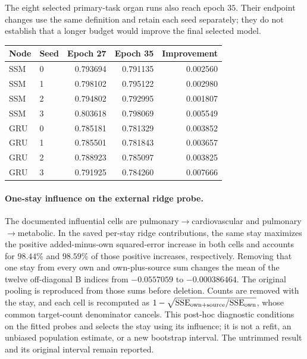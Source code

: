 The eight selected primary-task organ runs also reach epoch $35$. Their endpoint changes use the same definition and retain each seed separately; they do not establish that a longer budget would improve the final selected model.

\begin{center}\small
\begin{tabular}{llrrr}
\toprule
Node & Seed & Epoch 27 & Epoch 35 & Improvement\\
\midrule
SSM & 0 & 0.793694 & 0.791135 & 0.002560 \\
SSM & 1 & 0.798102 & 0.795122 & 0.002980 \\
SSM & 2 & 0.794802 & 0.792995 & 0.001807 \\
SSM & 3 & 0.803618 & 0.798069 & 0.005549 \\
GRU & 0 & 0.785181 & 0.781329 & 0.003852 \\
GRU & 1 & 0.785501 & 0.781843 & 0.003657 \\
GRU & 2 & 0.788923 & 0.785097 & 0.003825 \\
GRU & 3 & 0.791925 & 0.784260 & 0.007666 \\
\bottomrule
\end{tabular}
\end{center}

\paragraph{One-stay influence on the external ridge probe.}\label{app:ridgeinfluence}
The documented influential cells are pulmonary$\rightarrow$\allowbreak{}cardiovascular and pulmonary$\rightarrow$\allowbreak{}metabolic. In the saved per-stay ridge contributions, the same stay maximizes the positive added-minus-own squared-error increase in both cells and accounts for $98.44\%$ and $98.59\%$ of those positive increases, respectively. Removing that one stay from every own and own-plus-source sum changes the mean of the twelve off-diagonal B indices from $-0.0557059$ to $-0.000386464$. The original pooling is reproduced from those sums before deletion. Counts are removed with the stay, and each cell is recomputed as $1-\sqrt{\mathrm{SSE}_{\rm own+source}/\mathrm{SSE}_{\rm own}}$, whose common target-count denominator cancels. This post-hoc diagnostic conditions on the fitted probes and selects the stay using its influence; it is not a refit, an unbiased population estimate, or a new bootstrap interval. The untrimmed result and its original interval remain reported.


